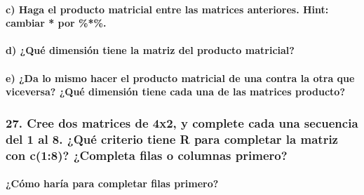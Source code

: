 \documentclass[
]{article}
\begin{document}
\hypertarget{c-haga-el-producto-matricial-entre-las-matrices-anteriores.-hint-cambiar-por-.}{%
\paragraph{c) Haga el producto matricial entre las matrices anteriores.
Hint: cambiar * por
\%*\%.}\label{c-haga-el-producto-matricial-entre-las-matrices-anteriores.-hint-cambiar-por-.}}

\hypertarget{d-quuxe9-dimensiuxf3n-tiene-la-matriz-del-producto-matricial}{%
\paragraph{d) ¿Qué dimensión tiene la matriz del producto
matricial?}\label{d-quuxe9-dimensiuxf3n-tiene-la-matriz-del-producto-matricial}}

\hypertarget{e-da-lo-mismo-hacer-el-producto-matricial-de-una-contra-la-otra-que-viceversa-quuxe9-dimensiuxf3n-tiene-cada-una-de-las-matrices-producto}{%
\paragraph{e) ¿Da lo mismo hacer el producto matricial de una contra la
otra que viceversa? ¿Qué dimensión tiene cada una de las matrices
producto?}\label{e-da-lo-mismo-hacer-el-producto-matricial-de-una-contra-la-otra-que-viceversa-quuxe9-dimensiuxf3n-tiene-cada-una-de-las-matrices-producto}}

\hypertarget{cree-dos-matrices-de-4x2-y-complete-cada-una-secuencia-del-1-al-8.-quuxe9-criterio-tiene-r-para-completar-la-matriz-con-c18-completa-filas-o-columnas-primero}{%
\subsubsection{27. Cree dos matrices de 4x2, y complete cada una
secuencia del 1 al 8. ¿Qué criterio tiene R para completar la matriz con
c(1:8)? ¿Completa filas o columnas
primero?}\label{cree-dos-matrices-de-4x2-y-complete-cada-una-secuencia-del-1-al-8.-quuxe9-criterio-tiene-r-para-completar-la-matriz-con-c18-completa-filas-o-columnas-primero}}

\hypertarget{cuxf3mo-haruxeda-para-completar-filas-primero}{%
\paragraph{¿Cómo haría para completar filas
primero?}\label{cuxf3mo-haruxeda-para-completar-filas-primero}}
\end{document}
